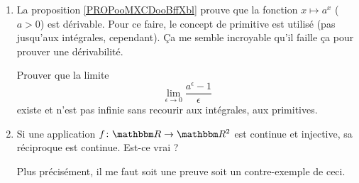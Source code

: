 \begin{enumerate}
        Le théorème-définition \ref{ThoWWAjXzi} donne le produit de mesures par la formule
        \begin{equation}  
            (\mu_1\otimes \mu_2)(A)=\int_{\Omega_1}\mu_2\big( A_2(x) \big)d\mu_1(x)=\int_{\Omega_2}\mu_1\big( A_1(y) \big)d\mu_2(y).
        \end{equation}
        On peut faire plus abstrait ?

        Sans une telle définition, l'ordre imposé est :
        \begin{itemize}
            \item mesure
            \item intégrale
            \item mesure produit.
        \end{itemize}
        En particulier, quand on voit l'intégrale, la mesure de Lebesgue sur \( \eR^n\) n'est pas encore définissable.

        Il serait bien de pouvoir faire :
        \begin{itemize}
            \item mesure
            \item mesure de Lebesgue sur \( \eR\)
            \item mesure produit
            \item mesure de Lebesgue sur \( \eR^n\)
            \item intégrale.
        \end{itemize}

    \item
        La proposition \ref{PROPooMXCDooBffXbl} prouve que la fonction \( x\mapsto a^x\) (\( a>0\)) est dérivable. Pour ce faire, le concept de primitive est utilisé (pas jusqu'aux intégrales, cependant). Ça me semble incroyable qu'il faille ça pour prouver une dérivabilité.

        Prouver que la limite
        \begin{equation}
            \lim_{\epsilon\to 0}\frac{ a^{\epsilon}-1 }{ \epsilon }
        \end{equation}
        existe et n'est pas infinie sans recourir aux intégrales, aux primitives.
    \item       \label{ITEMooVTBHooVoMzcq}
        Si une application \( f\colon \eR\to \eR^2\) est continue et injective, sa réciproque est continue. Est-ce vrai ?

        Plus précisément, il me faut soit une preuve soit un contre-exemple de ceci.


\end{enumerate}
